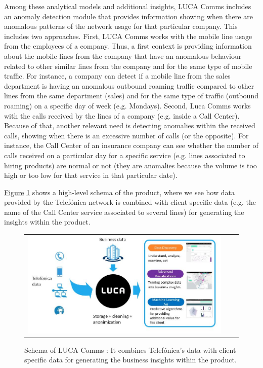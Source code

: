 Among these analytical models and additional insights, LUCA Comms includes an anomaly detection module that provides information showing when there are anomalous patterns of the network usage for that particular company. This includes two approaches. 
First, LUCA Comms works with the mobile line usage from the employees of a company. Thus, a first context is providing information about the mobile lines from the company that have an anomalous behaviour related to other similar lines from the company and for the same type of mobile traffic. For instance, a company can detect if a mobile line from the sales department is having an anomalous outbound roaming traffic compared to other lines from the same department (sales) and for the same type of traffic (outbound roaming) on a specific day of week (e.g. Mondays).
Second, Luca Comms works with the calls received by the lines of a company (e.g. inside a Call Center). Because of that, another relevant need is detecting anomalies within the received calls, showing when there is an excessive number of calls (or the opposite). For instance, the Call Center of an insurance company can see whether the number of calls received on a particular day for a specific service (e.g. lines associated to hiring products) are normal or not (they are anomalies because the volume is too high or too low for that service in that particular date).

\hyperref[fig:ch5-comms-description]{Figure} \ref{fig:ch5-comms-description} shows a high-level schema of the product, where we see how data provided by the Telefónica network is combined with client specific data (e.g. the name of the Call Center service associated to several lines) for generating the insights within the product.

\begin{figure}[h!]
\centering
  \begin{tabular}{c@{\qquad}c@{\qquad}c}
\includegraphics[width=0.90\columnwidth]{figures/chapter5_LucaComms/CommsDescription.JPG}
  \end{tabular} 
  \caption{Schema of LUCA Comms \parencite{patent2019comms}: It combines Telefónica's data with client specific data for generating the business insights within the product. \label{fig:ch5-comms-description}}
\end{figure}

